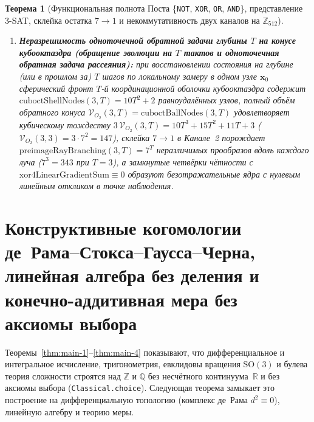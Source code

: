 \documentclass[11pt,a4paper]{article}
\theoremstyle{plain}
\newtheorem{theorem}{Теорема}[section]
\theoremstyle{definition}
\begin{document}
\begin{theorem}[Функциональная полнота Поста \{\texttt{NOT}, \texttt{XOR}, \texttt{OR}, \texttt{AND}\}, представление 3-SAT, склейка остатка $7\to 1$ и некоммутативность двух каналов на $\mathbb{Z}_{512}$]
\begin{enumerate}[label=\textbf{(\roman*)},leftmargin=*]
\item \textbf{Неразрешимость одноточечной обратной задачи глубины $T$ на конусе кубооктаэдра (обращение эволюции на $T$ тактов и одноточечная обратная задача рассеяния):}
  при восстановлении состояния на глубине (или в прошлом за) $T$ шагов по локальному замеру в одном узле $\mathbf{x}_0$ сферический фронт $T$-й координационной оболочки кубооктаэдра содержит $\mathrm{cuboctShellNodes}(3,T)=10T^2+2$ равноудалённых узлов, полный объём обратного конуса $\mathcal{V}_{O_2}(3,T)=\mathrm{cuboctBallNodes}(3,T)$ удовлетворяет кубическому тождеству $3\,\mathcal{V}_{O_2}(3,T)=10T^3+15T^2+11T+3$ ($\mathcal{V}_{O_2}(3,3)=3\cdot 7^2=147$), склейка $7\to 1$ в Канале~2 порождает $\mathrm{preimageRayBranching}(3,T)=7^T$ неразличимых прообразов вдоль каждого луча ($7^3=343$ при $T=3$), а замкнутые четвёрки чётности с $\mathrm{xor4LinearGradientSum}\equiv 0$ образуют безотражательные ядра с нулевым линейным откликом в точке наблюдения.
\end{enumerate}
\end{theorem}

\section{Конструктивные когомологии де~Рама--Стокса--Гаусса--Черна, линейная алгебра без деления и конечно-аддитивная мера без аксиомы выбора}
\label{sec:constructive-foundations}

Теоремы~\ref{thm:main-1}--\ref{thm:main-4} показывают, что дифференциальное и интегральное исчисление, тригонометрия, евклидовы вращения $\mathrm{SO}(3)$ и булева теория сложности строятся над $\mathbb{Z}$ и $\mathbb{Q}$ без несчётного континуума~$\mathbb{R}$ и без аксиомы выбора (\texttt{Classical.choice}). Следующая теорема замыкает это построение на дифференциальную топологию (комплекс де~Рама $d^2\equiv 0$), линейную алгебру и теорию меры.
\end{document}
